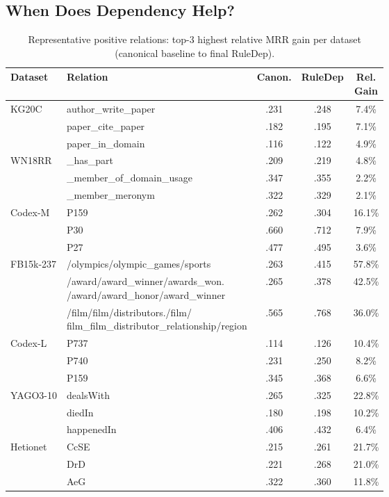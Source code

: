 \subsection{When Does Dependency Help?}


\begin{table}[t]
\centering
\caption{Representative positive relations: top-3 highest relative MRR gain per dataset (canonical baseline to final RuleDep).}
\label{tab:relation-top3-gain}
\setlength{\tabcolsep}{3pt}
\renewcommand{\arraystretch}{1.05}
\footnotesize
\begin{tabular}{llccc}
\toprule
Dataset & Relation & Canon. & RuleDep & \makecell{Rel.\\Gain} \\
\midrule
\multirow{3}{*}{KG20C} & author\_write\_paper & .231 & .248 & 7.4\% \\
 & paper\_cite\_paper & .182 & .195 & 7.1\% \\
 & paper\_in\_domain & .116 & .122 & 4.9\% \\
\multirow{3}{*}{WN18RR} & \_has\_part & .209 & .219 & 4.8\% \\
 & \_member\_of\_domain\_usage & .347 & .355 & 2.2\% \\
 & \_member\_meronym & .322 & .329 & 2.1\% \\
\multirow{3}{*}{Codex-M} & P159 & .262 & .304 & 16.1\% \\
 & P30 & .660 & .712 & 7.9\% \\
 & P27 & .477 & .495 & 3.6\% \\
\multirow{3}{*}{FB15k-237} & /olympics/olympic\_games/sports & .263 & .415 & 57.8\% \\
 & \makecell[l]{/award/award\_winner/awards\_won.\\/award/award\_honor/award\_winner} & .265 & .378 & 42.5\% \\
 & \makecell[l]{/film/film/distributors./film/\\film\_film\_distributor\_relationship/region} & .565 & .768 & 36.0\% \\
\multirow{3}{*}{Codex-L} & P737 & .114 & .126 & 10.4\% \\
 & P740 & .231 & .250 & 8.2\% \\
 & P159 & .345 & .368 & 6.6\% \\
\multirow{3}{*}{YAGO3-10} & dealsWith & .265 & .325 & 22.8\% \\
 & diedIn & .180 & .198 & 10.2\% \\
 & happenedIn & .406 & .432 & 6.4\% \\
\multirow{3}{*}{Hetionet} & CcSE & .215 & .261 & 21.7\% \\
 & DrD & .221 & .268 & 21.0\% \\
 & AeG & .322 & .360 & 11.8\% \\
\bottomrule
\end{tabular}
\end{table}

